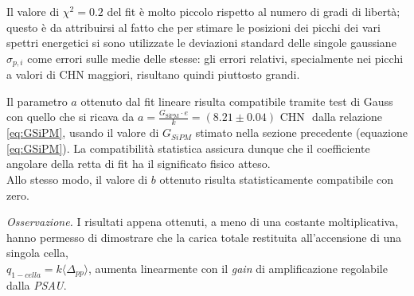Il valore di $\chi^2 = 0.2$ del fit è molto piccolo rispetto al numero di gradi di libertà; questo è da attribuirsi al fatto che per stimare le posizioni dei picchi dei vari spettri energetici si sono utilizzate le deviazioni standard delle singole gaussiane $\sigma_{p,i}$ come errori sulle medie delle stesse: gli errori relativi, specialmente nei picchi a valori di CHN maggiori, risultano quindi piuttosto grandi.

Il parametro $a$ ottenuto dal fit lineare risulta compatibile tramite test di Gauss con quello che si ricava da $ a = \frac{G_\text{SiPM}\cdot e}{k} = (8.21  \pm  0.04 ) \text{ CHN }$ dalla relazione \ref{eq:GSiPM}, usando il valore di $G_{SiPM}$ stimato nella sezione precedente (equazione \ref{eq:GSiPM}). La compatibilità statistica assicura dunque che il coefficiente angolare della retta di fit ha il significato fisico atteso. \\
Allo stesso modo, il valore di $b$ ottenuto risulta statisticamente compatibile con zero.

\textit{Osservazione.} I risultati appena ottenuti, a meno di una costante moltiplicativa, hanno permesso di dimostrare che la carica totale restituita all'accensione di una singola cella,\\$q_{1-cella}=k\langle\Delta_{pp}\rangle$, aumenta linearmente con il \textit{gain} di amplificazione regolabile dalla \textit{PSAU}.

